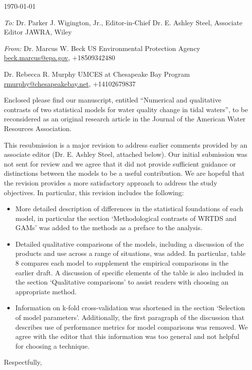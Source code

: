 \documentclass[a4paper,12pt]{article}
\begin{document}
\renewcommand{\rmdefault}{ptm}
\pagestyle{empty} 

\setlength{\parindent}{0mm} 
\setlength{\parskip}{5mm}

\begin{flushright}
\today
\end{flushright}

\emph{To:}\newline
Dr. Parker J. Wigington, Jr., Editor-in-Chief\newline
Dr. E. Ashley Steel, Associate Editor\newline
JAWRA, Wiley

\emph{From:}\newline
Dr. Marcus W. Beck\newline
US Environmental Protection Agency\newline
\href{mailto:beck.marcus@epa.gov}{beck.marcus@epa.gov}, +18509342480

Dr. Rebecca R. Murphy\newline
UMCES at Chesapeake Bay Program\newline
\href{mailto:rmurphy@chesapeakebay.net}{rmurphy@chesapeakebay.net}, +14102679837 \vspace{14.5pt}

Enclosed please find our manuscript, entitled ``Numerical and qualitative contrasts of two statistical models for water quality change in tidal waters'', to be reconsidered as an original research article in the Journal of the American Water Resources Association.  

This resubmission is a major revision to address earlier comments provided by an associate editor (Dr. E. Ashley Steel, attached below). Our initial submission was not sent for review and we agree that it did not provide sufficient guidance or distinctions between the models to be a useful contribution.  We are hopeful that the revision provides a more satisfactory approach to address the study objectives.  In particular, this revision includes the following:
\begin{itemize}
\item More detailed description of differences in the statistical foundations of each model, in particular the section `Methodological contrasts of WRTDS and GAMs' was added to the methods as a preface to the analysis.  
\item Detailed qualitative comparisons of the models, including a discussion of the products and use across a range of situations, was added.  In particular, table 8 compares each model to supplement the empirical comparisons in the earlier draft.  A discussion of specific elements of the table is also included in the section `Qualitative comparisons' to assist readers with choosing an appropriate method.
\item Information on k-fold cross-validation was shortened in the section `Selection of model parameters'.  Additionally, the first paragraph of the discussion that describes use of performance metrics for model comparisons was removed.  We agree with the editor that this information was too general and not helpful for choosing a technique.
\end{itemize}
\hspace{4.5in}Respectfully,
\end{document}
